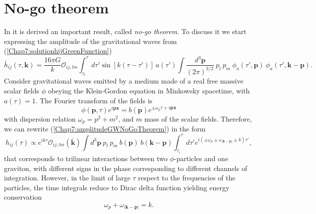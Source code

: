 \documentclass[11pt,a4paper,twoside]{book}
\begin{document}
\section{No-go theorem}
In \cite{Chap7:GreenMethod} it is derived an important result, called \textit{no-go theorem}. To discuss it we start expressing the amplitude of the gravitational waves from (\ref{Chap7:solutionhijGreenFunction}) 
\begin{equation}
\label{Chap7:amplitudeGWNoGoTheorem}
\bar{h}_{ij}(\tau,\textbf{k}) = \frac{16\pi G}{k}\mathcal{O}_{ij,lm}\int^{\tau}_{\tau_{i}} d\tau' \sin [k(\tau - \tau')]\  a(\tau')\int \frac{d^{3}\textbf{p}}{(2\pi)^{3/2}}\ p_{l}\  p_{m}\  \phi_{a}(\tau',\textbf{p})\  \phi_{a}(\tau',\textbf{k}-\textbf{p}).
\end{equation}
Consider gravitational waves emitted by a medium made of a real free massive scalar fields $\phi$ obeying the Klein-Gordon equation in Minkowsky spacetime, with $ a(\tau)=1 $. The Fourier transform of the fields is 
\begin{equation}
\label{Chap7:FourierTransformField}
\phi(\textbf{p},\tau)e^{i\textbf{p}\textbf{x}}=b(\textbf{p})e^{\pm \omega_{p}\tau + i \textbf{p}\textbf{x}}
\end{equation}
with dispersion relation $ \omega_{p}=p^{2}+m^{2} $, and $ m $ mass of the scalar fields. Therefore, we can rewrite (\ref{Chap7:amplitudeGWNoGoTheorem}) in the form
\begin{equation}
\label{Chap7:AmplitudeGWTrilinearInteraction}
h_{ij}(\tau) \propto e^{ik\tau}\mathcal{O}_{ij,lm}(\bar{\textbf{k}})\int d^{3}\textbf{p}\ p_{l}\ p_{m}\  b(\textbf{p})\ b(\textbf{k}-\textbf{p})\int^{\tau}_{\tau_{i}}d\tau'e^{i(\pm \omega_{p} \pm \omega_{|\textbf{k}-\textbf{p}|}  \pm k)\tau'},
\end{equation}
that corresponds to trilinear interactions between two $\phi$-particles and one graviton, with different signs in the phase corresponding to different channels of integration. However, in the limit of large $\tau$ respect to the frequencies of the particles, the time integrals reduce to Dirac delta function yielding energy conservation
\begin{equation}
\label{Chap7:NoGoTheorem_EnergyConservation}
\omega_{p} + \omega_{|\textbf{k}-\textbf{p}|}=k.
\end{equation}
\end{document}
